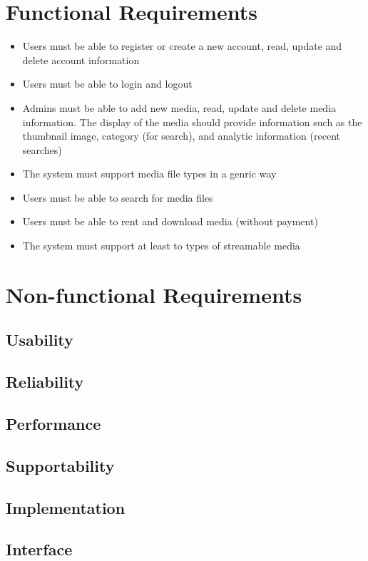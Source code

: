 \documentclass{report}
\begin{document}
\section{Functional Requirements}

\begin{itemize}
\item Users must be able to register or create a new account, read, update and delete  account information
\item Users must be able to login and logout
\item Admins must be able to add new media, read, update and delete media information. The display of the media should provide information such as the thumbnail image, category (for search), and analytic information (recent searches)
\item The system must support media file types in a genric way
\item Users must be able to search for media files
\item Users must be able to rent and download media (without payment)
\item The system must support at least to types of streamable media
\end{itemize}

\section{Non-functional Requirements}

\subsection{Usability}
\subsection{Reliability}
\subsection{Performance}
\subsection{Supportability}
\subsection{Implementation}
\subsection{Interface}
\end{document}
